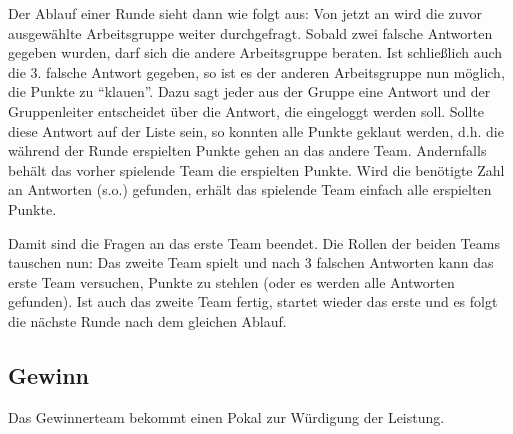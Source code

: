 \documentclass{scrartcl}
\begin{document}
Der Ablauf einer Runde sieht dann wie folgt aus: Von jetzt an wird die zuvor ausgewählte Arbeitsgruppe weiter durchgefragt. Sobald zwei falsche Antworten gegeben wurden, darf sich die andere Arbeitsgruppe beraten. Ist schließlich auch die 3. falsche Antwort gegeben, so ist es der anderen Arbeitsgruppe nun möglich, die Punkte zu "`klauen"'. Dazu sagt jeder aus der Gruppe eine Antwort und der Gruppenleiter entscheidet über die Antwort, die eingeloggt werden soll. Sollte diese Antwort auf der Liste sein, so konnten alle Punkte geklaut werden, d.h. die während der Runde erspielten Punkte gehen an das andere Team. Andernfalls behält das vorher spielende Team die erspielten Punkte. Wird die benötigte Zahl an Antworten (s.o.) gefunden, erhält das spielende Team einfach alle erspielten Punkte.

Damit sind die Fragen an das erste Team beendet. Die Rollen der beiden Teams tauschen nun: Das zweite Team spielt und nach 3 falschen Antworten kann das erste Team versuchen, Punkte zu stehlen (oder es werden alle Antworten gefunden). Ist auch das zweite Team fertig, startet wieder das erste und es folgt die nächste Runde nach dem gleichen Ablauf.

\subsection*{Gewinn}
Das Gewinnerteam bekommt einen Pokal zur Würdigung der Leistung.
\end{document}
